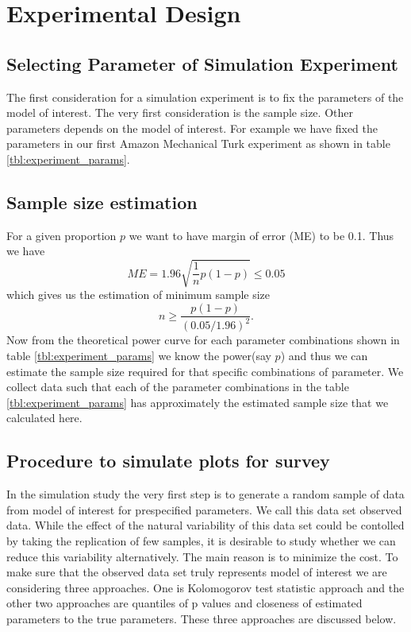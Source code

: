 \documentclass[11pt]{article}
\begin{document}
\section{Experimental Design} \label{sec:turk_exp}

\subsection{Selecting Parameter of Simulation Experiment} The first consideration for a simulation experiment is to fix the parameters of the model of interest. The very first consideration is the sample size. Other parameters depends on the model of interest. For example we have fixed the parameters in our first Amazon Mechanical Turk experiment as shown in table \ref{tbl:experiment_params}.

\subsection{Sample size estimation} For a given proportion $p$ we want to have margin of error (ME) to be 0.1. Thus we have $$ME =1.96 \sqrt{ \frac 1 n p(1-p)} \le 0.05$$ which gives us the estimation of minimum sample size $$n \geq \frac{p(1-p)}{(0.05/1.96)^2}.$$ Now from the theoretical power curve for each parameter combinations shown in table \ref{tbl:experiment_params} we know the power(say $p$) and thus we can estimate the sample size required for that specific combinations of parameter. We collect data such that each of the parameter combinations in the table \ref{tbl:experiment_params} has approximately the estimated sample size that we calculated here.


\subsection{Procedure to simulate plots for survey} \label{sec:simulate_plot} In the simulation study the very first step is to generate a random sample of data from model of interest for prespecified parameters. We call this data set observed data. While the effect of the natural variability of this data set could be contolled by taking the replication of few samples, it is desirable to study whether we can reduce this variability alternatively. The main reason is to minimize the cost. To make sure that the observed data set truly represents model of interest we are considering three approaches. One is Kolomogorov test statistic approach and the other two approaches are quantiles of p values and closeness of estimated parameters to the true parameters. These three approaches are discussed below.\\
\end{document}
